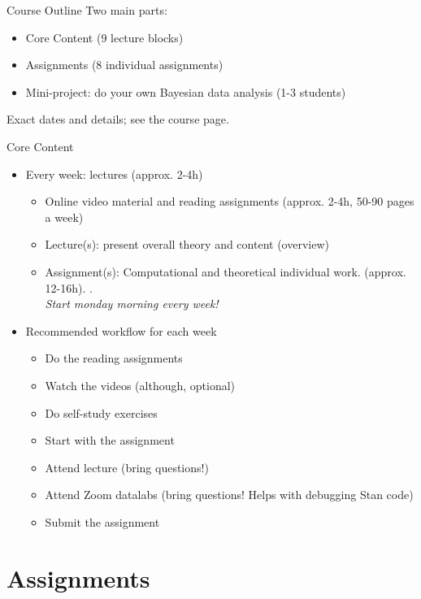 \documentclass[10pt]{beamer}
\begin{document}
\begin{frame}{Course Outline}
Two main parts:
\begin{itemize}
\item Core Content (9 lecture blocks)\pause
\item Assignments (8 individual assignments)\pause
\item Mini-project: do your own Bayesian data analysis (1-3 students)\pause
\end{itemize}
Exact dates and details; see the course page.
\end{frame}

\begin{frame}{Core Content}

\begin{itemize}
\item Every week: lectures (approx. 2-4h)
\begin{itemize}
\item Online video material and reading assignments (approx. 2-4h, 50-90 pages a week)
\item Lecture(s): present overall theory and content (overview)
\item Assignment(s): Computational and theoretical individual work. (approx. 12-16h). . \\ \emph{Start monday morning every week!}
\end{itemize}
\pause
\item Recommended workflow for each week
\begin{itemize}
\item Do the reading assignments
\item Watch the videos (although, optional)
\item Do self-study exercises
\item Start with the assignment
\item Attend lecture (bring questions!)
\item Attend Zoom datalabs (bring questions! Helps with debugging Stan code)
\item Submit the assignment
\end{itemize}
\end{itemize}

\end{frame}

\section{Assignments}
\frame{\sectionpage}
\end{document}
